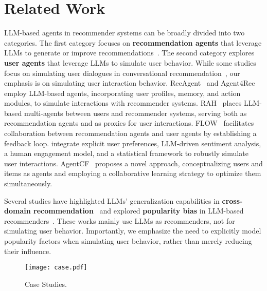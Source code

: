 \section{Related Work}
LLM-based agents in recommender systems can be broadly divided into two categories.
The first category focuses on \textbf{recommendation agents} that leverage LLMs to generate or improve recommendations~\cite{shi2024large,zhang2023recommendation,huang2023recommender,wang2023recmind,wang2024multi,zhao2024let,zhang2024prospect}.
%
The second category explores \textbf{user agents} that leverage LLMs to simulate user behavior.
While some studies focus on simulating user dialogues in conversational recommendation~\cite{zhu2024llm,zhu2024reliable,kim2024stop,friedman2023leveraging,wang2023rethinking}, our emphasis is on simulating user interaction behavior.
RecAgent~\cite{wang2024user} and Agent4Rec~\cite{zhang2024generative} employ LLM-based agents, incorporating user profiles, memory, and action modules, to simulate interactions with recommender systems.
RAH~\cite{shu2024rah} places LLM-based multi-agents between users and recommender systems, serving both as recommendation agents and as proxies for user interactions.
FLOW~\cite{cai2024flow} facilitates collaboration between recommendation agents and user agents by establishing a feedback loop.
\citet{zhang2024llm} integrate explicit user preferences, LLM-driven sentiment analysis, a human engagement model, and a statistical framework to robustly simulate user interactions.
AgentCF~\cite{zhang2024agentcf} proposes a novel approach, conceptualizing users and items as agents and employing a collaborative learning strategy to optimize them simultaneously.

Several studies have highlighted LLMs' generalization capabilities in \textbf{cross-domain recommendation}~\cite{bao2023tallrec,bai2024aligning,shen2024exploring,vajjala2024cross,petruzzelli2024instructing,tang2023one} and explored \textbf{popularity bias} in LLM-based recommenders~\cite{jiang2024item,lichtenberg2024large,gao2024sprec,ortega2024evaluating,deldjoo2024understanding}.
These works mainly use LLMs as recommenders, not for simulating user behavior.
Importantly, we emphasize the need to explicitly model popularity factors when simulating user behavior, rather than merely reducing their influence.

\begin{figure}[t]
  \centering
  \texttt{[image: case.pdf]}
  \caption{Case Studies.}
  \label{fig:93mi}
\end{figure}